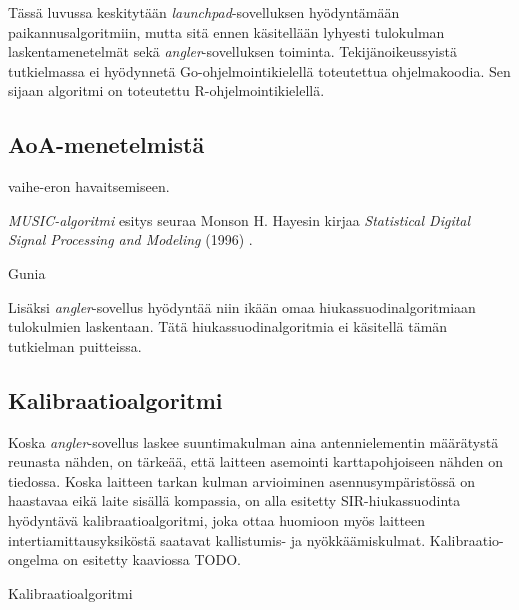 \documentclass[
  12pt,
  a4paper, twoside]{book}
\begin{document}
Tässä luvussa keskitytään \emph{launchpad}-sovelluksen hyödyntämään paikannusalgoritmiin, mutta sitä ennen käsitellään lyhyesti tulokulman laskentamenetelmät sekä \emph{angler}-sovelluksen toiminta. Tekijänoikeussyistä tutkielmassa ei hyödynnetä Go-ohjelmointikielellä toteutettua ohjelmakoodia. Sen sijaan algoritmi on toteutettu R-ohjelmointikielellä.

\subsection{AoA-menetelmistä} \label{aoa}

vaihe-eron havaitsemiseen.

\emph{MUSIC-algoritmi} esitys seuraa Monson H. Hayesin kirjaa \emph{Statistical Digital Signal Processing and Modeling} (1996) \citep{Hayes-1996}.

Gunia \citep{Gunia-2023}

Lisäksi \emph{angler}-sovellus hyödyntää niin ikään omaa hiukassuodinalgoritmiaan tulokulmien laskentaan. Tätä hiukassuodinalgoritmia ei käsitellä tämän tutkielman puitteissa.

\subsection{Kalibraatioalgoritmi}

Koska \emph{angler}-sovellus laskee suuntimakulman aina antennielementin määrätystä reunasta nähden, on tärkeää, että laitteen asemointi karttapohjoiseen nähden on tiedossa. Koska laitteen tarkan kulman arvioiminen asennusympäristössä on haastavaa eikä laite sisällä kompassia, on alla esitetty SIR-hiukassuodinta hyödyntävä kalibraatioalgoritmi, joka ottaa huomioon myös laitteen intertiamittausyksiköstä saatavat kallistumis- ja nyökkäämiskulmat. Kalibraatio-ongelma on esitetty kaaviossa TODO.

\begin{algorithm}[H]
\label{kalibraatioalgo}
\DontPrintSemicolon
\SetAlgoShortEnd
{}
\caption{Kalibraatioalgoritmi}
\end{algorithm}
\end{document}
